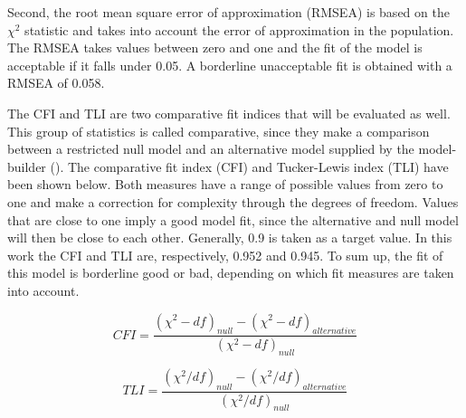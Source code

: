 \documentclass[11pt]{article}
\begin{document}
Second, the root mean square error of approximation (RMSEA) is based on the
$\chi^2$ statistic and takes into account the error of approximation in the
population. The RMSEA takes values between zero and one and the fit of the model
is acceptable if it falls under 0.05. A borderline unacceptable fit is obtained
with a RMSEA of 0.058.

The CFI and TLI are two comparative fit indices that will be evaluated as well.
This group of statistics is called comparative, since they make a comparison
between a restricted null model and an alternative model supplied by
the model-builder (\cite{brown2015}). The comparative fit index (CFI) and
Tucker-Lewis index (TLI) have been shown below. Both measures have a range of
possible values from zero to one and make a correction for complexity through
the degrees of freedom. Values that are close to one imply a good model fit,
since the alternative and null model will then be close to each other.
Generally, 0.9 is taken as a target value. In this work the CFI and TLI
are, respectively, 0.952 and 0.945. To sum up, the fit of this model is
borderline good or bad, depending on which fit measures are taken into account.

\begin{minipage}{0.48\linewidth}
\begin{equation}
\label{eq:cfi}
    CFI = \dfrac{(\chi^2 - df)_{null} - (\chi^2 - df)_{alternative}}{(\chi^2 - df)_{null}}
\end{equation}
\end{minipage}
\begin{minipage}{0.48\linewidth}
\begin{equation}
\label{eq:tli}
    TLI = \dfrac{(\chi^2 / df)_{null} - (\chi^2 / df)_{alternative}}{(\chi^2 / df)_{null}}
\end{equation}
\end{minipage}

\begin{table}[h!]
\captionsetup{singlelinecheck=off}
\caption{Test statistics}
\end{table}
\end{document}
